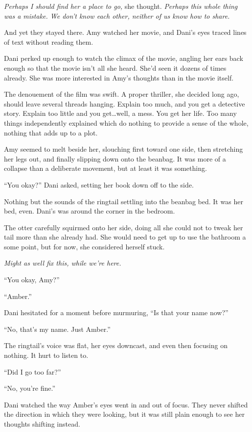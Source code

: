 \emph{Perhaps I should find her a place to go,} she thought. \emph{Perhaps this whole thing was a mistake. We don't know each other, neither of us know how to share.}

And yet they stayed there. Amy watched her movie, and Dani's eyes traced lines of text without reading them.

Dani perked up enough to watch the climax of the movie, angling her ears back enough so that the movie isn't all she heard. She'd seen it dozens of times already. She was more interested in Amy's thoughts than in the movie itself.

The denouement of the film was swift. A proper thriller, she decided long ago, should leave several threads hanging. Explain too much, and you get a detective story. Explain too little and you get\ldots{}well, a mess. You get her life. Too many things independently explained which do nothing to provide a sense of the whole, nothing that adds up to a plot.

Amy seemed to melt beside her, slouching first toward one side, then stretching her legs out, and finally slipping down onto the beanbag. It was more of a collapse than a deliberate movement, but at least it was something.

``You okay?'' Dani asked, setting her book down off to the side.

Nothing but the sounds of the ringtail settling into the beanbag bed. It was her bed, even. Dani's was around the corner in the bedroom.

The otter carefully squirmed onto her side, doing all she could not to tweak her tail more than she already had. She would need to get up to use the bathroom a some point, but for now, she considered herself stuck.

\emph{Might as well fix this, while we're here.}

``You okay, Amy?''

``Amber.''

Dani hesitated for a moment before murmuring, ``Is that your name now?''

``No, that's my name. Just Amber.''

The ringtail's voice was flat, her eyes downcast, and even then focusing on nothing. It hurt to listen to.

``Did I go too far?''

``No, you're fine.''

Dani watched the way Amber's eyes went in and out of focus. They never shifted the direction in which they were looking, but it was still plain enough to see her thoughts shifting instead.

